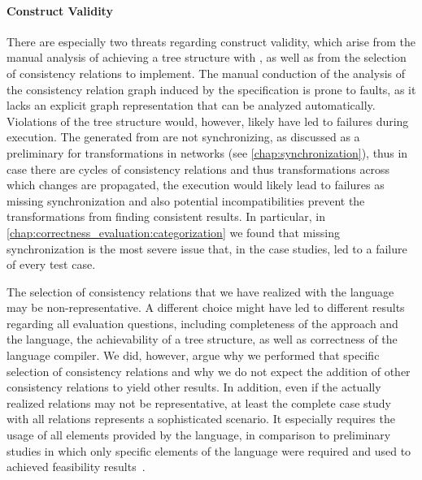 \paragraph{Construct Validity}
There are especially two threats regarding construct validity, which arise from the manual analysis of achieving a tree structure with \commonalities, as well as from the selection of consistency relations to implement.
The manual conduction of the analysis of the consistency relation graph induced by the \commonalities specification is prone to faults, as it lacks an explicit graph representation that can be analyzed automatically.
Violations of the tree structure would, however, likely have led to failures during execution.
The \reactions generated from \commonalities are not synchronizing, as discussed as a preliminary for transformations in networks (see \autoref{chap:synchronization}), thus in case there are cycles of consistency relations and thus transformations across which changes are propagated, the execution would likely lead to failures as missing synchronization and also potential incompatibilities prevent the transformations from finding consistent results.
In particular, in \autoref{chap:correctness_evaluation:categorization} we found that missing synchronization is the most severe issue that, in the case studies, led to a failure of every test case.

The selection of consistency relations that we have realized with the \commonalities language may be non-representative.
A different choice might have led to different results regarding all evaluation questions, including completeness of the approach and the language, the achievability of a tree structure, as well as correctness of the language compiler.
We did, however, argue why we performed that specific selection of consistency relations and why we do not expect the addition of other consistency relations to yield other results.
In addition, even if the actually realized relations may not be representative, at least the complete case study with all relations represents a sophisticated scenario.
It especially requires the usage of all elements provided by the \commonalities language, in comparison to preliminary studies in which only specific elements of the language were required and used to achieved feasibility results~.


